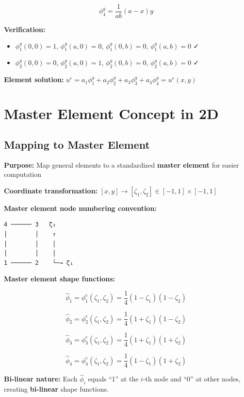 \documentclass[
  11pt,
  a4paper,
]{scrbook}
\providecommand{\tightlist}{%
  \setlength{\itemsep}{0pt}\setlength{\parskip}{0pt}}\usepackage{longtable,booktabs,array}
\begin{document}
\[\phi_4^g = \frac{1}{ab}(a-x)y\]

\textbf{Verification:}

\begin{itemize}
\tightlist
\item
  \(\phi_1^g(0,0) = 1\), \(\phi_1^g(a,0) = 0\), \(\phi_1^g(0,b) = 0\),
  \(\phi_1^g(a,b) = 0\) ✓
\item
  \(\phi_2^g(0,0) = 0\), \(\phi_2^g(a,0) = 1\), \(\phi_2^g(0,b) = 0\),
  \(\phi_2^g(a,b) = 0\) ✓
\end{itemize}

\textbf{Element solution:}
\(u^e = a_1 \phi_1^g + a_2 \phi_2^g + a_3 \phi_3^g + a_4 \phi_4^g = u^e(x,y)\)

\section{Master Element Concept in
2D}\label{master-element-concept-in-2d}

\subsection{Mapping to Master Element}\label{mapping-to-master-element}

\textbf{Purpose:} Map general elements to a standardized \textbf{master
element} for easier computation

\textbf{Coordinate transformation:}
\([x,y] \rightarrow [\zeta_1, \zeta_2] \in [-1,1] \times [-1,1]\)

\textbf{Master element node numbering convention:}

\begin{verbatim}
4 ────── 3   ζ₂
│        │    ↑
│        │    │
│        │    │
1 ────── 2    └─→ ζ₁
\end{verbatim}

\textbf{Master element shape functions:}

\[\hat{\phi}_1 = \phi_1^e(\zeta_1, \zeta_2) = \frac{1}{4}(1-\zeta_1)(1-\zeta_2)\]

\[\hat{\phi}_2 = \phi_2^e(\zeta_1, \zeta_2) = \frac{1}{4}(1+\zeta_1)(1-\zeta_2)\]

\[\hat{\phi}_3 = \phi_3^e(\zeta_1, \zeta_2) = \frac{1}{4}(1+\zeta_1)(1+\zeta_2)\]

\[\hat{\phi}_4 = \phi_4^e(\zeta_1, \zeta_2) = \frac{1}{4}(1-\zeta_1)(1+\zeta_2)\]

\textbf{Bi-linear nature:} Each \(\hat{\phi}_i\) equals ``1'' at the
\(i\)-th node and ``0'' at other nodes, creating \textbf{bi-linear}
shape functions.
\end{document}
